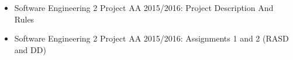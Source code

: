 \begin{itemize}
	\item Software Engineering 2 Project AA 2015/2016: Project Description And Rules
	\item Software Engineering 2 Project AA 2015/2016: Assignments 1 and 2 (RASD and DD) 
	
\end{itemize}